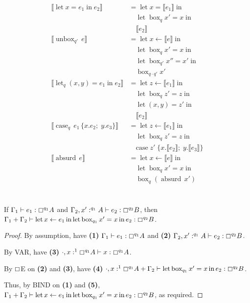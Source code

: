 \documentclass[acmsmall,screen,nonacm]{acmart}
\DeclareMathOperator{\llet}{\text{let}}
\DeclareMathOperator{\lin}{\text{in}}
\DeclareMathOperator{\case}{\text{case}}
\DeclareMathOperator{\bbox}{\text{box}}
\DeclareMathOperator{\unbox}{\text{unbox}}
\DeclareMathOperator{\absurd}{\text{absurd}}
\newcommand{\tee}{\vdash}
\newcommand{\sem}[1]{\llbracket #1 \rrbracket}
\begin{document}
\begin{align*}
  \sem{\llet x = e_1 \lin e_2}
    &= \llet x = \sem{e_1} \lin \\
    &\quad \llet \bbox_q x' = x \lin \\
    &\quad \sem{e_2} \\
  \sem{\unbox_{q'}\, e}
    &= \llet x \leftarrow \sem{e} \lin \\
    &\quad \llet \bbox_q x' = x \lin \\
    &\quad \llet \bbox_{q'} x'' = x' \lin \\
    &\quad \bbox_{q \cdot q'} x' \\
  \sem{\llet_q (x, y) = e_1 \lin e_2}
    &= \llet z \leftarrow \sem{e_1} \lin \\
    &\quad \llet \bbox_q z' = z \lin \\
    &\quad \llet (x, y) = z' \lin \\
    &\quad \sem{e_2} \\
  \sem{\case_q\, e_1\, \{x.e_2;\; y.e_3\}}
    &= \llet z \leftarrow \sem{e_1} \lin \\
    &\quad \llet \bbox_q z' = z \lin \\
    &\quad \mathrm{case}\; z'\; \{x.\sem{e_2};\; y.\sem{e_3}\} \\
  \sem{\absurd\, e} &= \llet x \leftarrow \sem{e} \lin \\
                 &\quad \llet \bbox_q x' = x \lin \\
                 &\quad \bbox_q (\absurd\, x') \\
\end{align*}
\\

\begin{lemma}
\label{lem:mode-qualifiers-box-cut}
  If $\Gamma_1 \tee e_1 : \boxempty^{q_1} A$ and $\Gamma_2, x^\prime :^{q_1} A \tee e_2 : \boxempty^{q_2} B$, then $\Gamma_1 + \Gamma_2 \tee \llet x \leftarrow e_1 \lin \llet \bbox_{q_1} x^\prime = x \lin e_2 : \boxempty^{q_2} B$.
\end{lemma}

\begin{proof}
  By assumption, have \textbf{(1)} $\Gamma_1 \tee e_1 : \boxempty^{q_1} A$ and \textbf{(2)} $\Gamma_2, x^\prime :^{q_1} A \tee e_2 : \boxempty^{q_2} B$.

  By VAR, have \textbf{(3)} $\cdot, x :^1 \boxempty^{q_1} A \tee x : \boxempty^{q_1} A$.

  By $\boxempty$E on \textbf{(2)} and \textbf{(3)}, have \textbf{(4)} $\cdot, x :^1 \boxempty^{q_1} A + \Gamma_2 \tee \llet \bbox_{q_1} x^\prime = x \lin e_2 : \boxempty^{q_2} B$.

  Thus, by BIND on \textbf{(1)} and \textbf{(5)}, $\Gamma_1 + \Gamma_2 \tee \llet x \leftarrow e_1 \lin \llet \bbox_{q_1} x^\prime = x \lin e_2 : \boxempty^{q_2} B$, as required.
  
\end{proof}
\end{document}
